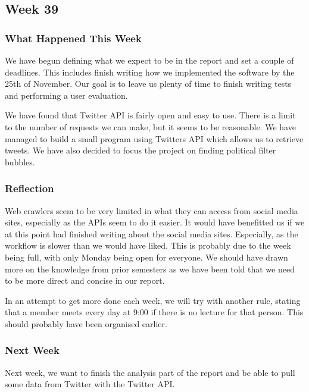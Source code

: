 \subsection{Week 39}
\subsubsection{What Happened This Week}
We have begun defining what we expect to be in the report and set a couple of
deadlines. This includes finish writing how we implemented the software by the
25th of November. Our goal is to leave us plenty of time to finish writing
tests and performing a user evaluation.\nl

We have found that Twitter \ac{API} is fairly open and easy to use. There is a
limit to the number of requests we can make, but it seems to be reasonable. We
have managed to build a small program using Twitters API which allows us to
retrieve tweets. We have also decided to focus the project on finding political
filter bubbles.

\subsubsection{Reflection}
Web crawlers seem to be very limited in what they can access from social media
sites, especially as the APIs seem to do it easier. It would have
benefitted us if we at this point had finished writing about the social media
sites. Especially, as the workflow is slower than we would have liked. This is
probably due to the week being full, with only Monday being open for everyone.
We should have drawn more on the knowledge from prior semesters as we have been
told that we need to be more direct and concise in our report.\nl

In an attempt to get more done each week, we will try with another rule, stating
that a member meets every day at 9:00 if there is no lecture for that person.
This should probably have been organised earlier.

\subsubsection{Next Week}
Next week, we want to finish the analysis part of the report and be able to pull
some data from Twitter with the Twitter \ac{API}.
	



